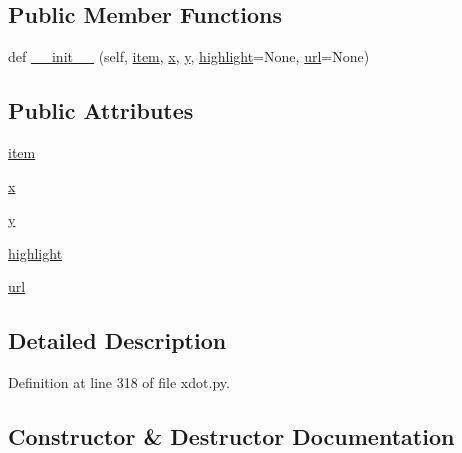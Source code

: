 \subsection*{Public Member Functions}
\begin{DoxyCompactItemize}
\item 
def \hyperlink{classsmacc__viewer_1_1xdot_1_1xdot_1_1Jump_a918885239fba3f09fa40a5159cfd9c33}{\+\_\+\+\_\+init\+\_\+\+\_\+} (self, \hyperlink{classsmacc__viewer_1_1xdot_1_1xdot_1_1Jump_a3806104ce12d4a05d2ca2bd5675ff3a3}{item}, \hyperlink{classsmacc__viewer_1_1xdot_1_1xdot_1_1Jump_aa4319356dbccd819bc97cc09d7a0bf09}{x}, \hyperlink{classsmacc__viewer_1_1xdot_1_1xdot_1_1Jump_a7a95126431e515149487604d46fc3623}{y}, \hyperlink{classsmacc__viewer_1_1xdot_1_1xdot_1_1Jump_acda965133459d64421b163c37f38b8e7}{highlight}=None, \hyperlink{classsmacc__viewer_1_1xdot_1_1xdot_1_1Jump_a96cf56e017551b2aa85ff549b802bb56}{url}=None)
\end{DoxyCompactItemize}
\subsection*{Public Attributes}
\begin{DoxyCompactItemize}
\item 
\hyperlink{classsmacc__viewer_1_1xdot_1_1xdot_1_1Jump_a3806104ce12d4a05d2ca2bd5675ff3a3}{item}
\item 
\hyperlink{classsmacc__viewer_1_1xdot_1_1xdot_1_1Jump_aa4319356dbccd819bc97cc09d7a0bf09}{x}
\item 
\hyperlink{classsmacc__viewer_1_1xdot_1_1xdot_1_1Jump_a7a95126431e515149487604d46fc3623}{y}
\item 
\hyperlink{classsmacc__viewer_1_1xdot_1_1xdot_1_1Jump_acda965133459d64421b163c37f38b8e7}{highlight}
\item 
\hyperlink{classsmacc__viewer_1_1xdot_1_1xdot_1_1Jump_a96cf56e017551b2aa85ff549b802bb56}{url}
\end{DoxyCompactItemize}


\subsection{Detailed Description}


Definition at line 318 of file xdot.\+py.



\subsection{Constructor \& Destructor Documentation}
